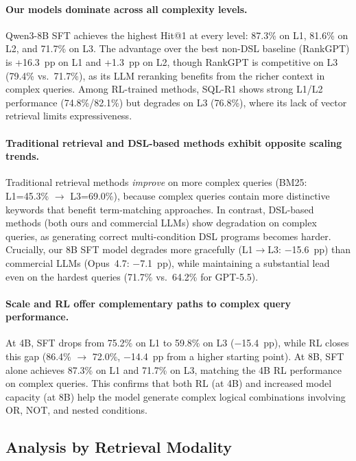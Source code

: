 \documentclass[11pt]{article}
\begin{document}
\paragraph{Our models dominate across all complexity levels.}
Qwen3-8B SFT achieves the highest Hit@1 at every level: 87.3\% on L1, 81.6\% on L2, and 71.7\% on L3. The advantage over the best non-DSL baseline (RankGPT) is +16.3~pp on L1 and +1.3~pp on L2, though RankGPT is competitive on L3 (79.4\% vs.\ 71.7\%), as its LLM reranking benefits from the richer context in complex queries. Among RL-trained methods, SQL-R1 shows strong L1/L2 performance (74.8\%/82.1\%) but degrades on L3 (76.8\%), where its lack of vector retrieval limits expressiveness.

\paragraph{Traditional retrieval and DSL-based methods exhibit opposite scaling trends.}
Traditional retrieval methods \emph{improve} on more complex queries (BM25: L1=45.3\% $\to$ L3=69.0\%), because complex queries contain more distinctive keywords that benefit term-matching approaches.
In contrast, DSL-based methods (both ours and commercial LLMs) show degradation on complex queries, as generating correct multi-condition DSL programs becomes harder.
Crucially, our 8B SFT model degrades more gracefully (L1$\to$L3: $-$15.6~pp) than commercial LLMs (Opus~4.7: $-$7.1~pp), while maintaining a substantial lead even on the hardest queries (71.7\% vs.\ 64.2\% for GPT-5.5).

\paragraph{Scale and RL offer complementary paths to complex query performance.}
At 4B, SFT drops from 75.2\% on L1 to 59.8\% on L3 ($-$15.4~pp), while RL closes this gap (86.4\% $\to$ 72.0\%, $-$14.4~pp from a higher starting point). At 8B, SFT alone achieves 87.3\% on L1 and 71.7\% on L3, matching the 4B RL performance on complex queries. This confirms that both RL (at 4B) and increased model capacity (at 8B) help the model generate complex logical combinations involving OR, NOT, and nested conditions.


\subsection{Analysis by Retrieval Modality}
\label{sec:modality}
\end{document}
